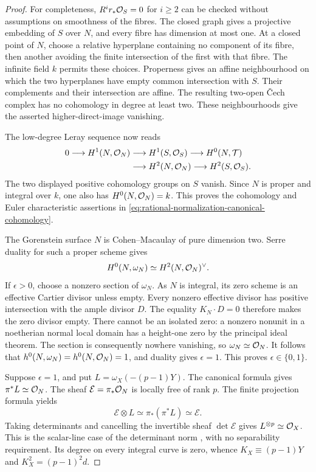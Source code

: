 \begin{proof}
For completeness, $R^ir_*\mathcal O_S=0$ for $i\geq2$ can be checked
without assumptions on smoothness of the fibres.
The closed graph gives a projective embedding of $S$ over $N$,
and every fibre has dimension at most one.
At a closed point of $N$, choose a relative hyperplane containing
no component of its fibre, then another avoiding the finite
intersection of the first with that fibre.
The infinite field $k$ permits these choices.
Properness gives an affine neighbourhood on which the two
hyperplanes have empty common intersection with $S$.
Their complements and their intersection are affine.
The resulting two-open \v{C}ech complex has no cohomology in
degree at least two. These neighbourhoods give the asserted
higher-direct-image vanishing.

The low-degree Leray sequence now reads
\[
 \begin{split}
 0\longrightarrow H^1(N,\mathcal O_N)
 &\longrightarrow H^1(S,\mathcal O_S)
 \longrightarrow H^0(N,\mathcal T)\\
 &\longrightarrow H^2(N,\mathcal O_N)
 \longrightarrow H^2(S,\mathcal O_S).
 \end{split}
\]
The two displayed positive cohomology groups on $S$ vanish.
Since $N$ is proper and integral over $k$, one also has
$H^0(N,\mathcal O_N)=k$. This proves the cohomology and Euler
characteristic assertions in
\eqref{eq:rational-normalization-canonical-cohomology}.

The Gorenstein surface $N$ is Cohen--Macaulay of pure dimension
two. Serre duality for such a proper scheme
\cite[Lemma~48.27.5, Tag~0FVZ, and Remark~48.27.6, Tag~0FW0]{Stacks}
gives
\[
 H^0(N,\omega_N)\simeq H^2(N,\mathcal O_N)^\vee.
\]
If $\epsilon>0$, choose a nonzero section of $\omega_N$.
As $N$ is integral, its zero scheme is an effective Cartier
divisor unless empty. Every nonzero effective divisor has
positive intersection with the ample divisor $D$.
The equality $K_N\cdot D=0$ therefore makes the zero divisor empty.
There cannot be an isolated zero: a nonzero nonunit in a
noetherian normal local domain has a height-one zero by the
principal ideal theorem.
The section is consequently nowhere vanishing, so
$\omega_N\simeq\mathcal O_N$. It follows that
$h^0(N,\omega_N)=h^0(N,\mathcal O_N)=1$, and duality gives $\epsilon=1$.
This proves $\epsilon\in\{0,1\}$.

Suppose $\epsilon=1$, and put $L=\omega_X(-(p-1)Y)$.
The canonical formula gives $\pi^*L\simeq\mathcal O_N$.
The sheaf $\mathcal E=\pi_*\mathcal O_N$ is locally free of rank $p$.
The finite projection formula yields
\[
 \mathcal E\otimes L
 \simeq\pi_*(\pi^*L)
 \simeq\mathcal E.
\]
Taking determinants and cancelling the invertible sheaf
$\det\mathcal E$ gives $L^{\otimes p}\simeq\mathcal O_X$.
This is the scalar-line case of the determinant norm
\cite[Tag~0BD2]{Stacks}, with no separability requirement.
Its degree on every integral curve is zero, whence
$K_X\equiv(p-1)Y$ and $K_X^2=(p-1)^2d$.


\end{proof}
